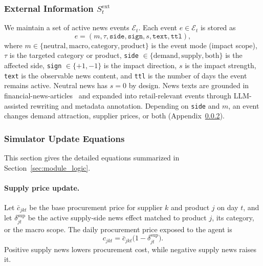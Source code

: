 \subsubsection{External Information \texorpdfstring{$S_t^{\text{ext}}$}{S t ext}}

We maintain a set of active news events $\mathcal{E}_t$. Each event $e \in \mathcal{E}_t$ is stored as
\begin{equation}
e=(m,\tau,\texttt{side},\texttt{sign},s,\texttt{text},\texttt{ttl}),
\label{eq:news_record}
\end{equation}
where $m \in \{\text{neutral}, \text{macro}, \text{category}, \text{product}\}$ is the event mode (impact scope), $\tau$ is the targeted category or product, \texttt{side} $\in \{\text{demand}, \text{supply}, \text{both}\}$ is the affected side, \texttt{sign} $\in \{+1,-1\}$ is the impact direction, $s$ is the impact strength, \texttt{text} is the observable news content, and \texttt{ttl} is the number of days the event remains active. Neutral news has $s = 0$ by design. News texts are grounded in financial-news-articles~\citep{ashraq2025financialNewsArticles} and expanded into retail-relevant events through LLM-assisted rewriting and metadata annotation. Depending on \texttt{side} and $m$, an event changes demand attraction, supplier prices, or both (Appendix~\ref{app:simulator_update_equations}).

\subsubsection{Simulator Update Equations}
\label{app:simulator_update_equations}

This section gives the detailed equations summarized in Section~\ref{sec:module_logic}.

\paragraph{Supply price update.}
Let $\bar c_{jkt}$ be the base procurement price for supplier $k$ and product $j$ on day $t$, and let $\delta^{\mathrm{sup}}_{jt}$ be the active supply-side news effect matched to product $j$, its category, or the macro scope. The daily procurement price exposed to the agent is
\begin{equation}
c_{jkt}=\bar c_{jkt}\bigl(1-\delta^{\mathrm{sup}}_{jt}\bigr).
\label{eq:supply_price}
\end{equation}
Positive supply news lowers procurement cost, while negative supply news raises it.


